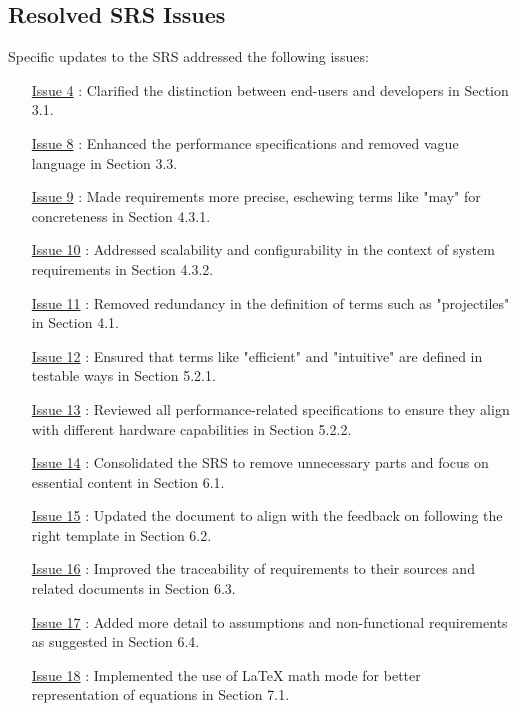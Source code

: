 \documentclass[12pt]{article}
\begin{document}
\subsection{Resolved SRS Issues}
Specific updates to the SRS addressed the following issues:
\begin{itemize}
\item [\href{https://github.com/XessX/Angry_Bird_Alike/issues/4}{Issue 4}]: Clarified the distinction between end-users and developers in Section 3.1.
    \item [\href{https://github.com/XessX/Angry_Bird_Alike/issues/8}{Issue 8}]: Enhanced the performance specifications and removed vague language in Section 3.3.
    \item [\href{https://github.com/XessX/Angry_Bird_Alike/issues/9}{Issue 9}]: Made requirements more precise, eschewing terms like "may" for concreteness in Section 4.3.1.
    \item [\href{https://github.com/XessX/Angry_Bird_Alike/issues/10}{Issue 10}]: Addressed scalability and configurability in the context of system requirements in Section 4.3.2.
    \item [\href{https://github.com/XessX/Angry_Bird_Alike/issues/11}{Issue 11}]: Removed redundancy in the definition of terms such as "projectiles" in Section 4.1.
    \item [\href{https://github.com/XessX/Angry_Bird_Alike/issues/12}{Issue 12}]: Ensured that terms like "efficient" and "intuitive" are defined in testable ways in Section 5.2.1.
    \item [\href{https://github.com/XessX/Angry_Bird_Alike/issues/13}{Issue 13}]: Reviewed all performance-related specifications to ensure they align with different hardware capabilities in Section 5.2.2.
    \item [\href{https://github.com/XessX/Angry_Bird_Alike/issues/14}{Issue 14}]: Consolidated the SRS to remove unnecessary parts and focus on essential content in Section 6.1.
    \item [\href{https://github.com/XessX/Angry_Bird_Alike/issues/15}{Issue 15}]: Updated the document to align with the feedback on following the right template in Section 6.2.
    \item [\href{https://github.com/XessX/Angry_Bird_Alike/issues/16}{Issue 16}]: Improved the traceability of requirements to their sources and related documents in Section 6.3.
    \item [\href{https://github.com/XessX/Angry_Bird_Alike/issues/17}{Issue 17}]: Added more detail to assumptions and non-functional requirements as suggested in Section 6.4.
    \item [\href{https://github.com/XessX/Angry_Bird_Alike/issues/18}{Issue 18}]: Implemented the use of LaTeX math mode for better representation of equations in Section 7.1.
\end{itemize}
\end{document}
